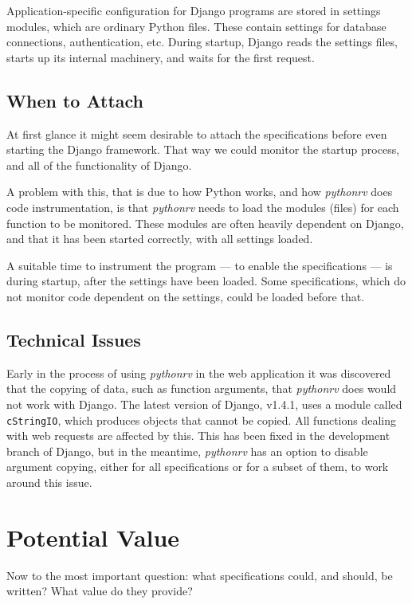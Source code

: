 \documentclass[a4paper,11pt]{kth-mag}
\begin{document}
Application-specific configuration for Django programs are stored in settings
modules, which are ordinary Python files. These contain settings for database
connections, authentication, etc. During startup, Django reads the settings
files, starts up its internal machinery, and waits for the first request.


\subsection{When to Attach}

At first glance it might seem desirable to attach the specifications before
even starting the Django framework. That way we could monitor the startup
process, and all of the functionality of Django.

A problem with this, that is due to how Python works, and how \textit{pythonrv}
does code instrumentation, is that \textit{pythonrv} needs to load the modules
(files) for each function to be monitored. These modules are often heavily
dependent on Django, and that it has been started correctly, with all settings
loaded.

A suitable time to instrument the program --- to enable the specifications ---
is during startup, after the settings have been loaded. Some specifications,
which do not monitor code dependent on the settings, could be loaded before
that.


\subsection{Technical Issues}

Early in the process of using \textit{pythonrv} in the web application it was
discovered that the copying of data, such as function arguments, that
\textit{pythonrv} does would not work with Django. The latest version of
Django, v1.4.1, uses a module called \texttt{cStringIO}, which produces objects
that cannot be copied. All functions dealing with web requests are affected by
this. This has been fixed in the development branch of Django, but in the
meantime, \textit{pythonrv} has an option to disable argument copying, either
for all specifications or for a subset of them, to work around this issue.


\section{Potential Value}

Now to the most important question: what specifications could, and should, be
written? What value do they provide?
\end{document}
